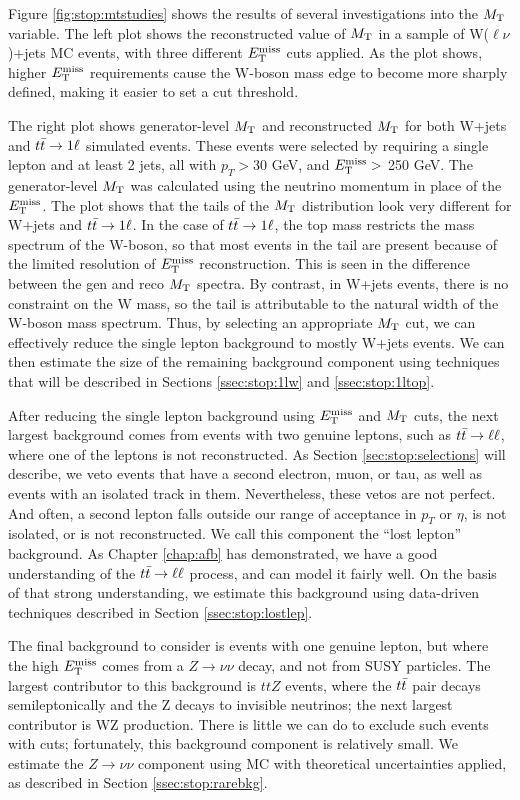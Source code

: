 Figure \ref{fig:stop:mtstudies} shows the results of several
investigations into the $M_\text{T}$ variable. The left plot shows the
reconstructed value of $M_\text{T}$ in a sample of W($\ell\nu$)+jets MC
events, with three different $E_\text{T}^\text{miss}$ cuts applied. As the plot shows,
higher $E_\text{T}^\text{miss}$ requirements cause the W-boson mass edge to become more
sharply defined, making it easier to set a cut threshold.

The right plot shows generator-level $M_\text{T}$ and reconstructed $M_\text{T}$
for both W+jets and $t\bar{t} \rightarrow 1\ell$ simulated events. These
events were selected by requiring a single lepton and at least 2
jets, all with $p_T > 30$ GeV, and $E_\text{T}^\text{miss} >$ 250 GeV. The generator-level $M_\text{T}$ was
calculated using the neutrino momentum in place of the $E_\text{T}^\text{miss}$. The plot
shows that the tails of the $M_\text{T}$ distribution look very different for
W+jets and $t\bar{t} \rightarrow 1\ell$. In the case of $t\bar{t} \rightarrow 1\ell$, the top mass
restricts the mass spectrum of the W-boson, so that most events in the
tail are present because of the limited resolution of $E_\text{T}^\text{miss}$
reconstruction. This is seen in the difference between the gen and reco
$M_\text{T}$ spectra. By contrast, in W+jets events, there is no constraint
on the W mass, so the tail is attributable to the natural width of the
W-boson mass spectrum. Thus, by selecting an appropriate $M_\text{T}$ cut, we
can effectively reduce the single lepton background to mostly W+jets
events. We can then estimate the size of the remaining background
component using techniques that will be described in Sections
\ref{ssec:stop:1lw} and \ref{ssec:stop:1ltop}.

After reducing the single lepton background using $E_\text{T}^\text{miss}$ and $M_\text{T}$ cuts,
the next largest background comes from events with two genuine
leptons, such as $t\bar{t} \rightarrow \ell\ell$, where one of the leptons is not
reconstructed. As Section \ref{sec:stop:selections} will describe, we
veto events that have a second electron, muon, or tau, as well as
events with an isolated track in them. Nevertheless, these vetos are
not perfect. And often, a second lepton falls outside our range of
acceptance in $p_T$ or $\eta$, is not isolated, or is not
reconstructed. We call this component the ``lost lepton''
background. As Chapter \ref{chap:afb} has demonstrated, we have a good
understanding of the $t\bar{t} \rightarrow \ell\ell$ process, and can model it fairly
well. On the basis of that strong understanding, we estimate this
background using data-driven techniques described in Section
\ref{ssec:stop:lostlep}.

The final background to consider is events with one genuine lepton,
but where the high $E_\text{T}^\text{miss}$ comes from a $Z \rightarrow \nu\nu$ decay,
and not from SUSY particles. The largest contributor to this
background is $ttZ$ events, where the $t\bar{t}$ pair decays
semileptonically and the Z decays to invisible neutrinos; the next
largest contributor is WZ production. There is little we can do to
exclude such events with cuts; fortunately, this background component
is relatively small. We estimate the $Z \rightarrow \nu\nu$
component using MC with theoretical uncertainties applied, as
described in Section \ref{ssec:stop:rarebkg}.

